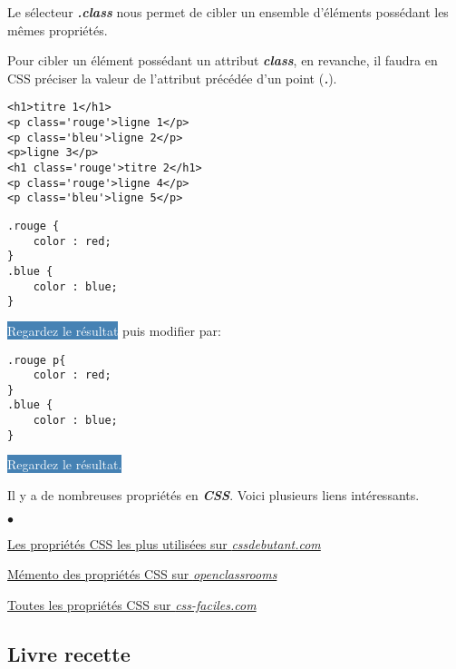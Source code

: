 \documentclass[10pt,dvipsnames, dvips, svgnames]{article}
\begin{document}
 Le sélecteur \textbf{\textit{.class}} nous permet de cibler un ensemble d'éléments possédant les mêmes propriétés.

 Pour cibler un élément possédant un attribut \textbf{\textit{class}}, en revanche, il faudra en CSS préciser la valeur de l'attribut précédée d'un point (\textbf{\textit{.}}).


\begin{lstlisting}
<h1>titre 1</h1>
<p class='rouge'>ligne 1</p>
<p class='bleu'>ligne 2</p>
<p>ligne 3</p>
<h1 class='rouge'>titre 2</h1>
<p class='rouge'>ligne 4</p>
<p class='bleu'>ligne 5</p>
\end{lstlisting}

\begin{lstlisting}
.rouge {
	color : red;
}
.blue {
	color : blue;
}
\end{lstlisting}

\colorbox{SteelBlue}{\textcolor{white}{Regardez le résultat}} puis modifier par:

\begin{lstlisting}
.rouge p{
	color : red;
}
.blue {
	color : blue;
}
\end{lstlisting}

\colorbox{SteelBlue}{\textcolor{white}{Regardez le résultat.}}


Il y a de nombreuses propriétés en \textbf{\textit{CSS}}.  Voici plusieurs liens intéressants.

\begin{list}{$\bullet$}{}
\item \href{https://www.cssdebutant.com/debuter-en-css-les-definitions-css.html}{Les propriétés CSS les plus utilisées sur \textit{cssdebutant.com}}
\item \href{https://openclassrooms.com/fr/courses/1603881-apprenez-a-creer-votre-site-web-avec-html5-et-css3/1608902-memento-des-proprietes-css}{Mémento des propriétés CSS sur \textit{openclassrooms}}
\item \href{http://www.css-faciles.com/proprietes-css-liste-alphabetique.php}{Toutes les propriétés CSS sur \textit{css-faciles.com}}
\end{list}



\subsection{Livre recette}
\end{document}
